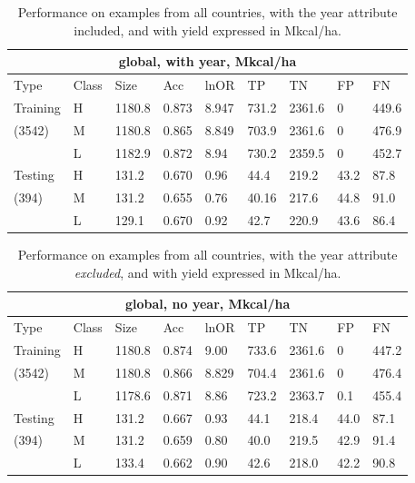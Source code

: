 \documentclass[11pt]{article}
\begin{document}
\begin{table}[h!]
\centering
\begin{tabular}{lllllllll}
\toprule
\multicolumn{9}{c}{\textbf{global, with year, Mkcal/ha}} \\
\midrule
Type & Class & Size & Acc & lnOR & TP & TN & FP & FN \\
\midrule
Training & H & 1180.8 & 0.873 & 8.947 & 731.2 & 2361.6 & 0 & 449.6  \\
(3542) & M & 1180.8 & 0.865 & 8.849 & 703.9 & 2361.6 & 0 & 476.9  \\
& L & 1182.9 & 0.872 & 8.94 & 730.2 & 2359.5 & 0 & 452.7  \\
Testing & H & 131.2 & 0.670 & 0.96 & 44.4 & 219.2 & 43.2 & 87.8  \\
(394) & M & 131.2 & 0.655 & 0.76 & 40.16 & 217.6 & 44.8 & 91.0  \\
& L & 129.1 & 0.670 & 0.92 & 42.7 & 220.9 & 43.6 & 86.4  \\
\bottomrule
\end{tabular}
\caption{Performance on examples from all countries, with the year attribute included, and with yield expressed in Mkcal/ha.}
\label{k.wy.wt_results}
\end{table}

\begin{table}[h!]
\centering
\begin{tabular}{lllllllll}
\toprule
\multicolumn{9}{c}{\textbf{global, no year, Mkcal/ha}} \\
\midrule
Type & Class & Size & Acc & lnOR & TP & TN & FP & FN \\
\midrule
Training & H & 1180.8 & 0.874 & 9.00 & 733.6 & 2361.6 & 0 & 447.2  \\
(3542) & M & 1180.8 & 0.866 & 8.829 & 704.4 & 2361.6 & 0 & 476.4  \\
& L & 1178.6 & 0.871 & 8.86 & 723.2 & 2363.7 & 0.1 & 455.4  \\
Testing & H & 131.2 & 0.667 & 0.93 & 44.1 & 218.4 & 44.0 & 87.1  \\
(394) & M & 131.2 & 0.659 & 0.80 & 40.0 & 219.5 & 42.9 & 91.4  \\
& L & 133.4 & 0.662 & 0.90 & 42.6 & 218.0 & 42.2 & 90.8  \\
\bottomrule
\end{tabular}
\caption{Performance on examples from all countries, with the year attribute \emph{excluded}, and with yield expressed in Mkcal/ha.}
\label{k.ny.wt_results}
\end{table}
\end{document}
